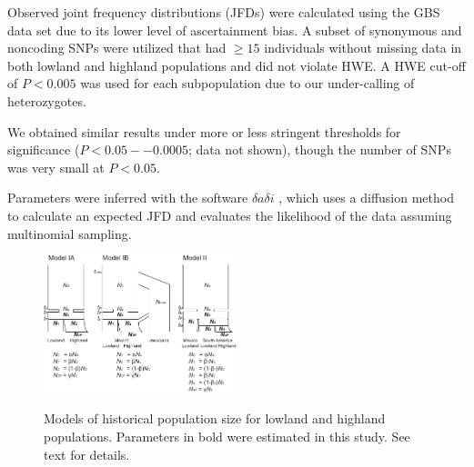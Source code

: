 Observed joint frequency distributions (JFDs) were calculated using the GBS data set due to its lower level of ascertainment bias. 
A subset of synonymous and noncoding SNPs were utilized that had $\geq15$ individuals without missing data in both lowland and highland populations and did not violate HWE.  
A HWE cut-off of $P<0.005$ was used for each subpopulation due to our under-calling of heterozygotes. 

We obtained similar results under more or less stringent thresholds for significance ($P < 0.05 -- 0.0005$; data not shown), though the number of SNPs was very small at $P<0.05$.  

Parameters were inferred with the software $\delta a \delta i$ \cite[]{Gutenkunst_2009_19851460}, which uses a diffusion method to calculate an expected JFD and evaluates the likelihood of the data assuming multinomial sampling.

\begin{figure}[tb]   
  \begin{center}
   \vspace{-0mm}
   \includegraphics[width=0.5\textwidth]{fig/Fig3}
   \renewcommand{\baselinestretch}{0.9}
   \vspace{-3mm}
   \caption{  Models of historical population size for lowland and highland populations.  Parameters in bold were estimated in this study.  See text for details.
   }
\vspace{-6mm}
    \label{model}
  \end{center}
\end{figure}

